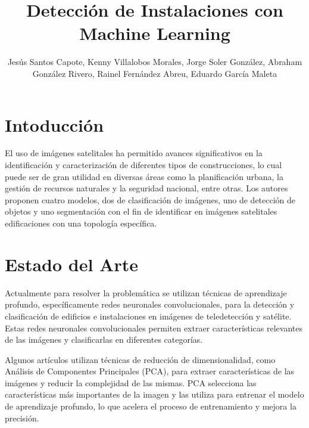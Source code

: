 \documentclass[article]{llncs}
\begin{document}
%
\title{Detecci\'on de Instalaciones con Machine Learning}
%
%
\author{Jes\'us Santos Capote, Kenny Villalobos Morales, Jorge Soler Gonz\'alez, Abraham Gonz\'alez Rivero, 
Rainel Fern\'andez Abreu, Eduardo Garc\'ia Maleta}
%
%
\maketitle              %
%



\section{Intoducci\'on}
El uso de imágenes satelitales ha permitido avances significativos en la identificación y caracterización de diferentes 
tipos de construcciones, lo cual puede ser de gran utilidad en diversas áreas como la planificación urbana, la gestión de 
recursos naturales y la seguridad nacional, entre otras. Los autores proponen cuatro modelos, dos de clasificación de im\'agenes, 
uno de detección de objetos y uno segmentaci\'on con el fin de identificar en im\'agenes satelitales edificaciones con una topolog\'ia espec\'ifica.

\section{Estado del Arte}
Actualmente para resolver la problemática se utilizan técnicas de aprendizaje profundo, específicamente 
redes neuronales convolucionales, para la detección y clasificación de edificios e instalaciones en imágenes de 
teledetección y satélite. Estas redes neuronales convolucionales permiten extraer características relevantes de las imágenes 
y clasificarlas en diferentes categorías.

Algunos artículos utilizan técnicas de reducción de dimensionalidad, como Análisis de Componentes Principales 
(PCA), para extraer características de las imágenes y reducir la complejidad de las mismas. PCA selecciona las 
características más importantes de la imagen y las utiliza para entrenar el modelo de aprendizaje profundo, lo que 
acelera el proceso de entrenamiento y mejora la precisión.
\end{document}
